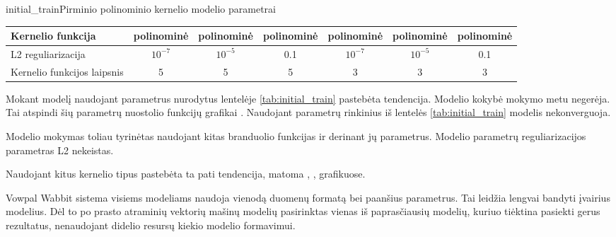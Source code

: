 \begin{ktutable}{initial_train}{Pirminio polinominio kernelio modelio parametrai}
    \begin{tabular}{| l | c | c | c | c | c | c | }
    \hline
        Kernelio funkcija & polinominė & polinominė & polinominė & polinominė & polinominė & polinominė \\ \hline
        L2 reguliarizacija & $10^{-7}$ & $10^{-5}$ & 0.1 & $10^{-7}$ & $10^{-5}$ & 0.1 \\ \hline
        Kernelio funkcijos laipsnis & 5 & 5 & 5 & 3 & 3 & 3 \\ \hline
    \end{tabular}
\end{ktutable}

Mokant modelį naudojant parametrus nurodytus lentelėje \vref{tab:initial_train} pastebėta tendencija. Modelio kokybė mokymo metu negerėja. Tai atspindi šių parametrų nuostolio funkcijų grafikai . Naudojant parametrų rinkinius iš lentelės \vref{tab:initial_train} modelis nekonverguoja.


Modelio mokymas toliau tyrinėtas naudojant kitas branduolio funkcijas ir derinant jų parametrus. Modelio parametrų reguliarizacijos parametras L2 nekeistas.


Naudojant kitus kernelio tipus pastebėta ta pati tendencija, matoma , ,  grafikuose.


Vowpal Wabbit sistema visiems modeliams naudoja vienodą duomenų formatą bei paanšius parametrus. Tai leidžia lengvai bandyti įvairius modelius. Dėl to po prasto atraminių vektorių mašinų modelių pasirinktas vienas iš paprasčiausių modelių, kuriuo tiėktina pasiekti gerus rezultatus, nenaudojant didelio resursų kiekio modelio formavimui.

